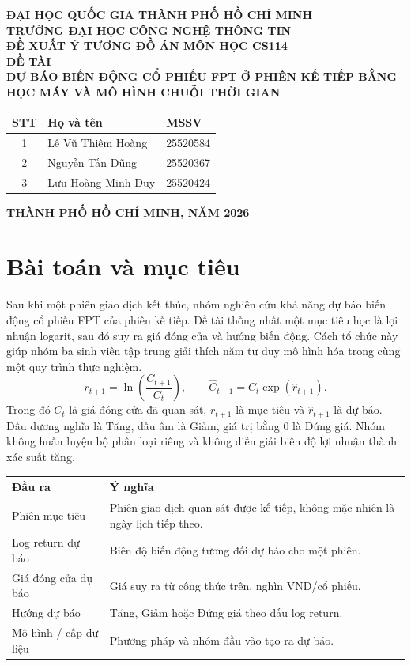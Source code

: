 \documentclass[12pt,a4paper]{article}
\begin{document}
\begin{titlepage}
\begin{center}
{\large\textbf{ĐẠI HỌC QUỐC GIA THÀNH PHỐ HỒ CHÍ MINH}}\\
{\large\textbf{TRƯỜNG ĐẠI HỌC CÔNG NGHỆ THÔNG TIN}}\\[3.0cm]
{\Large\textbf{ĐỀ XUẤT Ý TƯỞNG ĐỒ ÁN MÔN HỌC CS114}}\\[0.6cm]
{\large\textbf{ĐỀ TÀI}}\\[0.5cm]
{\Large\textbf{DỰ BÁO BIẾN ĐỘNG CỔ PHIẾU FPT Ở PHIÊN KẾ TIẾP BẰNG HỌC MÁY VÀ MÔ HÌNH CHUỖI THỜI GIAN}}\\[1.4cm]
\renewcommand{\arraystretch}{1.25}
\begin{tabular}{cll}
\toprule
\textbf{STT} & \textbf{Họ và tên} & \textbf{MSSV}\\
\midrule
1 & Lê Vũ Thiêm Hoàng & 25520584\\
2 & Nguyễn Tấn Dũng & 25520367\\
3 & Lưu Hoàng Minh Duy & 25520424\\
\bottomrule
\end{tabular}
\end{center}
\vfill
\begin{center}\textbf{THÀNH PHỐ HỒ CHÍ MINH, NĂM 2026}\end{center}
\end{titlepage}
\tableofcontents
\newpage

\section{Bài toán và mục tiêu}
Sau khi một phiên giao dịch kết thúc, nhóm nghiên cứu khả năng dự báo biến động cổ phiếu FPT của phiên kế tiếp. Đề tài thống nhất một mục tiêu học là lợi nhuận logarit, sau đó suy ra giá đóng cửa và hướng biến động. Cách tổ chức này giúp nhóm ba sinh viên tập trung giải thích năm tư duy mô hình hóa trong cùng một quy trình thực nghiệm.
\[
r_{t+1}=\ln\!\left(\frac{C_{t+1}}{C_t}\right),\qquad
\widehat C_{t+1}=C_t\exp(\widehat r_{t+1}).
\]
Trong đó $C_t$ là giá đóng cửa đã quan sát, $r_{t+1}$ là mục tiêu và $\widehat r_{t+1}$ là dự báo. Dấu dương nghĩa là Tăng, dấu âm là Giảm, giá trị bằng 0 là Đứng giá. Nhóm không huấn luyện bộ phân loại riêng và không diễn giải biên độ lợi nhuận thành xác suất tăng.

{\small\renewcommand{\arraystretch}{1.15}
\begin{tabularx}{\textwidth}{@{}p{4.0cm}Y@{}}
\toprule
\textbf{Đầu ra} & \textbf{Ý nghĩa}\\\midrule
Phiên mục tiêu & Phiên giao dịch quan sát được kế tiếp, không mặc nhiên là ngày lịch tiếp theo.\\
Log return dự báo & Biên độ biến động tương đối dự báo cho một phiên.\\
Giá đóng cửa dự báo & Giá suy ra từ công thức trên, nghìn VND/cổ phiếu.\\
Hướng dự báo & Tăng, Giảm hoặc Đứng giá theo dấu log return.\\
Mô hình / cấp dữ liệu & Phương pháp và nhóm đầu vào tạo ra dự báo.\\
\bottomrule
\end{tabularx}}
\end{document}
